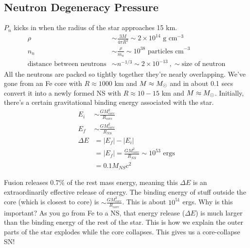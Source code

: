 \subsection{Neutron Degeneracy Pressure}
$P_n$ kicks in when the radius of the star approaches 15 km. 
\begin{align}
\rho &\sim \frac{3M}{4 \pi R^3} \sim 2 \times 10^{14} \textrm{ g cm}^{-3}\\
n_n &\sim \frac{\rho}{m_n} \sim 10^{38}\textrm{ particles cm}^{-3}\\
\textrm{distance between neutrons}&\sim n^{-1/3} \sim 2 \times 10^{-13}~,\sim \textrm{size of neutron}
\end{align}
All the neutrons are packed so tightly together they're nearly overlapping. We've gone from an Fe core with $R \approx 1000$ km and $M \approx M_\odot$ and in about 0.1 secs convert it into a newly formed NS with $R \approx 10-15$ km and $M \approx M_\odot$. Initially, there's a certain gravitational binding energy associated with the star.
\begin{align}
E_i &\sim \frac{GM_{core}^2}{R_{core}}\\
E_f &\sim \frac{GM_{core}^2}{R_{NS}}\\
\Delta E &= |E_f| - |E_i| \\
&= |E_f| =\frac{GM_{core}^2}{R_{NS}} \sim 10^{53}\textrm{ ergs} \\
&= 0.1 M_{NS} c^2
\end{align}

Fusion releases 0.7\% of the rest mass energy, meaning this $\Delta E$ is an extraordinarily effective release of energy. The binding energy of stuff outside the core (which is closest to core) is $\sim \frac{GM_{core}^2}{R_{core}}$. This is about $10^{51}$ ergs. Why is this important? As you go from Fe to a NS, that energy release ($\Delta E$) is much larger than the binding energy of the rest of the star. This is how we explain the outer parts of the star explodes while the core collapses. This gives us a core-collapse SN!

